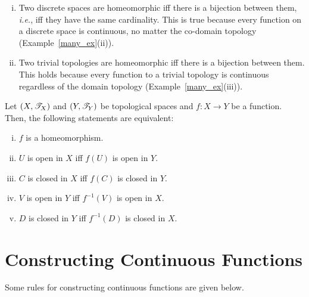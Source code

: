 \documentclass[a4paper,english,12pt]{article}
\begin{document}
\begin{exmp}
\begin{enumerate}[i)]
\item Two discrete spaces are homeomorphic iff there is a bijection between them, \emph{i.e.}, iff they have the same cardinality. This is true because every function on a discrete space is continuous, no matter the co-domain topology (Example~\ref{many_ex}(ii)). 
\item Two trivial topologies are homeomorphic iff there is a bijection between them. This holds because every function to a trivial topology is continuous regardless of the domain topology (Example~\ref{many_ex}(iii)). 
\end{enumerate}
\end{exmp}

\begin{prop} Let $(X,\mathscr{T}_X)$ and $(Y,\mathscr{T}_Y)$ be topological spaces and $f:X\to Y$ be a function. Then, the following statements are equivalent:
\begin{enumerate}[i)]
\item $f$ is a homeomorphism.
\item $U$ is open in $X$ iff $f(U)$ is open in $Y$.
\item $C$ is closed in $X$ iff $f(C)$ is closed in $Y$.
\item $V$ is open in $Y$ iff $f^{-1}(V)$ is open in $X$.
\item $D$ is closed in $Y$ iff $f^{-1}(D)$ is closed in $X$.
\end{enumerate}
\end{prop}

\section{Constructing Continuous Functions}
Some rules for constructing continuous functions are given below.
\end{document}
